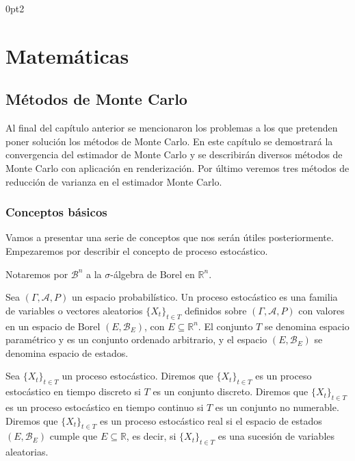 \titlespacing*{\subsection}
  {0pt}{2\baselineskip}{\baselineskip}

\part{Matemáticas}

\chapter{Métodos de Monte Carlo}\label{MonteCarlo}

Al final del capítulo anterior se mencionaron los problemas a los que pretenden poner solución los métodos de Monte Carlo. En este capítulo se demostrará la convergencia del estimador de Monte Carlo y se describirán diversos métodos de Monte Carlo con aplicación en renderización. Por último veremos tres métodos de reducción de varianza en el estimador Monte Carlo.

\section{Conceptos básicos}

Vamos a presentar una serie de conceptos que nos serán útiles posteriormente. Empezaremos por describir el concepto de proceso estocástico.

\begin{notacion}
Notaremos por $\mathscr{B}^n$ a la $\sigma$-álgebra de Borel en $\mathds{R}^n$.
\end{notacion}

\begin{definicion}
 Sea $(\Gamma, \mathcal{A}, P)$ un espacio probabilístico. Un proceso estocástico es una familia de variables o vectores aleatorios $\{X_t\}_{t\in T}$ definidos sobre $(\Gamma, \mathcal{A}, P)$ con valores en un espacio de Borel $(E, \mathscr{B}_E)$, con $E\subseteq \mathds{R}^n$. El conjunto $T$ se denomina espacio paramétrico y es un conjunto ordenado arbitrario, y el espacio $(E, \mathscr{B}_E)$ se denomina espacio de estados. 
\end{definicion}

\begin{definicion}
Sea $\{X_t\}_{t\in T}$ un proceso estocástico. Diremos que $\{X_t\}_{t\in T}$ es un proceso estocástico en tiempo discreto si $T$ es un conjunto discreto. Diremos que $\{X_t\}_{t\in T}$ es un proceso estocástico en tiempo continuo si $T$ es un conjunto no numerable. Diremos que $\{X_t\}_{t\in T}$ es un proceso estocástico real si el espacio de estados $(E,\mathscr{B}_E)$ cumple que $E\subseteq \mathds{R}$, es decir, si $\{X_t\}_{t\in T}$ es una sucesión de variables aleatorias.
\end{definicion}

